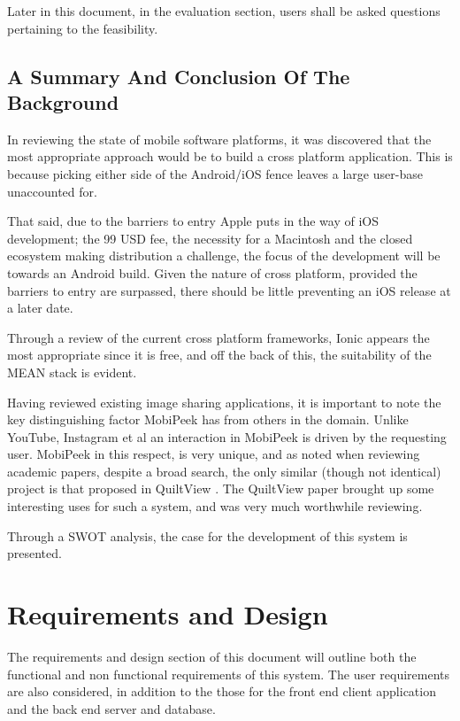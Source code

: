 \documentclass[a4paper]{article}
\begin{document}
Later in this document, in the evaluation section, users shall be asked questions pertaining to the feasibility.
\subsection{A Summary And Conclusion Of The Background}
In reviewing the state of mobile software platforms, it was discovered that the most appropriate approach would be to build a cross platform application. This is because picking either side of the Android/iOS fence leaves a large user-base unaccounted for. 

That said, due to the barriers to entry Apple puts in the way of iOS development; the 99 USD fee, the necessity for a Macintosh and the closed ecosystem making distribution a challenge, the focus of the development will be towards an Android build. Given the nature of cross platform, provided the barriers to entry are surpassed, there should be little preventing an iOS release at a later date.

Through a review of the current cross platform frameworks, Ionic appears the most appropriate since it is free, and off the back of this, the suitability of the MEAN stack is evident.

Having reviewed existing image sharing applications, it is important to note the key distinguishing factor MobiPeek has from others in the domain. Unlike YouTube, Instagram et al an interaction in MobiPeek is driven by the requesting user. MobiPeek in this respect, is very unique, and as noted when reviewing academic papers, despite a broad search, the only similar (though not identical) project is that proposed in QuiltView \cite{chen2014quiltview}. The QuiltView paper brought up some interesting uses for such a system, and was very much worthwhile reviewing.

Through a SWOT analysis, the case for the development of this system is presented.




\section{Requirements and Design}

The requirements and design section of this document will outline both the functional and non functional requirements of this system. The user requirements are also considered, in addition to the those for the front end client application and the back end server and database.
\end{document}
